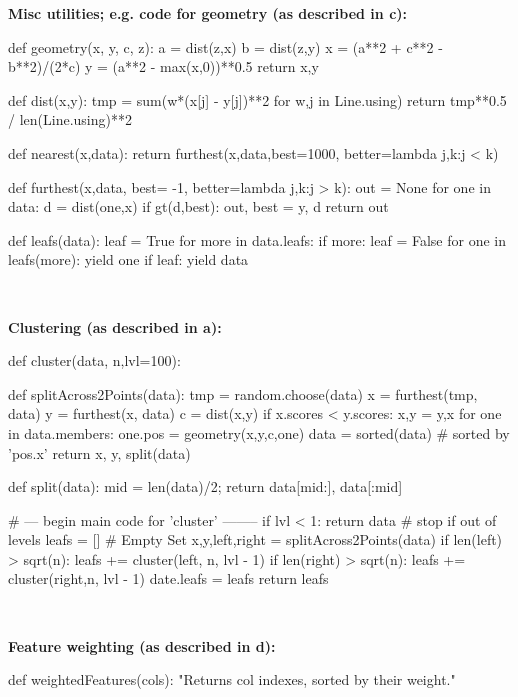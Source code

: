 \begin{figure*}
\begin{minipage}[t]{.45\linewidth}
{\bf Misc utilities; e.g. code for geometry (as described in c):}

 
\begin{python}[left]
def geometry(x, y, c, z): 
  a = dist(z,x)
  b = dist(z,y) 
  x = (a**2 + c**2 - b**2)/(2*c) 
  y = (a**2 - max(x,0))**0.5
  return x,y

def dist(x,y):
   tmp = sum(w*(x[j] - y[j])**2 for w,j in Line.using) 
   return tmp**0.5 / len(Line.using)**2
   
def nearest(x,data):
  return furthest(x,data,best=1000,
                    better=lambda j,k:j < k)
 
def furthest(x,data, best= -1, 
                     better=lambda j,k:j > k):  
  out = None
  for one in data:
    d = dist(one,x)
    if gt(d,best): out, best = y, d
  return out

def leafs(data):
  leaf = True
  for more in data.leafs:
    if more:
       leaf = False
       for one in leafs(more):
         yield one
  if leaf: 
    yield data
\end{python}
 \end{minipage}~~~~~~~~~\begin{minipage}[t]{.45\linewidth} 
\scriptsize\vspace{1mm}
{\bf Clustering (as described in a):}
\begin{python}[right]
def cluster(data, n,lvl=100):

  def splitAcross2Points(data): 
    tmp = random.choose(data)
    x = furthest(tmp, data)
    y = furthest(x, data) 
    c = dist(x,y)  
    if x.scores < y.scores:
      x,y = y,x 
    for one in data.members: 
      one.pos = geometry(x,y,c,one)
    data = sorted(data) # sorted by 'pos.x'
    return x, y, split(data)
  
  def split(data):   
    mid = len(data)/2; 
    return data[mid:], data[:mid]
    
  # --- begin main code for  'cluster' --------
  if lvl < 1: 
     return data # stop if out of levels
  leafs = [] # Empty Set
  x,y,left,right = splitAcross2Points(data) 
  if len(left) > sqrt(n):  
     leafs += cluster(left, n, lvl - 1)  
  if len(right) > sqrt(n):
     leafs += cluster(right,n,  lvl - 1) 
  date.leafs = leafs
  return leafs
\end{python} 

~~

{\bf Feature weighting  (as described in d):}

\begin{python}[right]
def weightedFeatures(cols):
  "Returns col indexes, sorted by their weight."
  

\end{python}
\end{minipage}
\end{figure*}
